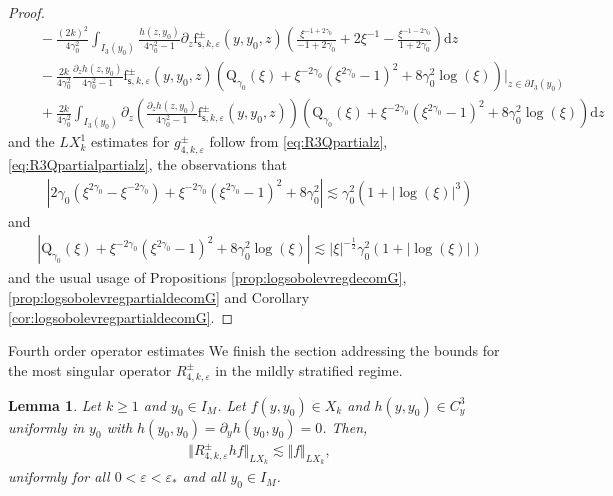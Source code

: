 \documentclass[11pt,reqno]{amsproc}
\makeatletter
\renewcommand\subsection{\@startsection{subsection}{2}%
\normalparindent{.5\linespacing\@plus.7\linespacing}{-.5em}
{\normalfont\bfseries}}
\newtheorem{lemma}[proposition]{Lemma}
\theoremstyle{definition}
\numberwithin{equation}{section}
\newcommand{\s}{{\mathsf{s}}}
\renewcommand{\d}{\mathrm{d}}
\newcommand{\ep}{\varepsilon}
\makeatother
\begin{document}
\begin{proof}
\begin{align*}
&\quad - \frac{(2k)^2}{4\gamma_0^2}\int_{I_3(y_0)} \frac{h(z,y_0)}{4\gamma_0^2 -1} \partial_z \mathrm{f}_{\s,k,\ep}^\pm(y,y_0,z)  \left( \frac{\xi^{-1+2\gamma_0}}{-1+2\gamma_0} +2\xi^{-1} -\frac{\xi^{-1-2\gamma_0}}{1+2\gamma_0} \right) \d z \\
&\quad -\frac{2k}{4\gamma_0^2}\frac{\partial_z h(z,y_0)}{4\gamma_0^2-1} \mathrm{f}_{\s,k,\ep}^\pm(y,y_0,z)\left( \mathrm{Q}_{\gamma_0}(\xi)  + \xi^{-2\gamma_0}\left( \xi^{2\gamma_0}-1 \right)^2  + 8\gamma_0^2\log(\xi)  \right) \Big|_{z\in \partial I_3(y_0)} \\
&\quad + \frac{2k}{4\gamma_0^2}\int_{I_3(y_0)}\partial_z \left( \frac{\partial_z h(z,y_0)}{4\gamma_0^2-1}\mathrm{f}_{\s,k,\ep}^\pm(y,y_0,z)\right) \left( \mathrm{Q}_{\gamma_0}(\xi)  + \xi^{-2\gamma_0}\left( \xi^{2\gamma_0}-1 \right)^2  + 8\gamma_0^2\log(\xi)  \right) \d z
\end{align*}
and the $LX_k^1$ estimates for $g_{4,k,\ep}^\pm$ follow from \eqref{eq:R3Qpartialz}, \eqref{eq:R3Qpartialpartialz}, the observations that
\begin{align*}
\left| 2\gamma_0 \left( \xi^{2\gamma_0} - \xi^{-2\gamma_0} \right) + \xi^{-2\gamma_0}\left( \xi^{2\gamma_0} -1 \right)^2 + 8\gamma_0^2 \right| \lesssim \gamma_0^2\left( 1 + |\log(\xi)|^3 \right)
\end{align*}
and
\begin{align*}
\left| \mathrm{Q}_{\gamma_0}(\xi)  + \xi^{-2\gamma_0}\left( \xi^{2\gamma_0}-1 \right)^2  + 8\gamma_0^2\log(\xi)  \right| \lesssim |\xi|^{-\frac12}\gamma_0^2 \left( 1 + |\log(\xi)| \right) 
\end{align*}
and the usual usage of Propositions \ref{prop:logsobolevregdecomG}, \ref{prop:logsobolevregpartialdecomG} and Corollary \ref{cor:logsobolevregpartialdecomG}.
\end{proof}

\subsection{Fourth order operator estimates}
We finish the section addressing the bounds for the most singular operator $R_{4,k,\ep}^\pm$ in the mildly stratified regime.

\begin{lemma}\label{lemma:R4mapsC2LXktoC2LXk}
Let $k\geq 1$ and $y_0\in I_M$. Let $f(y,y_0)\in X_k$ and $h(y,y_0)\in C^3_y$ uniformly in $y_0$ with $h(y_0,y_0) = \partial_y h(y_0,y_0) = 0$. Then,
\begin{align*}
\Vert R_{4,k,\ep}^\pm hf \Vert_{LX_k}\lesssim  \Vert f \Vert_{LX_k},
\end{align*}
uniformly for all $0<\ep<\ep_*$ and all $y_0\in I_M$. 
\end{lemma}
\end{document}
